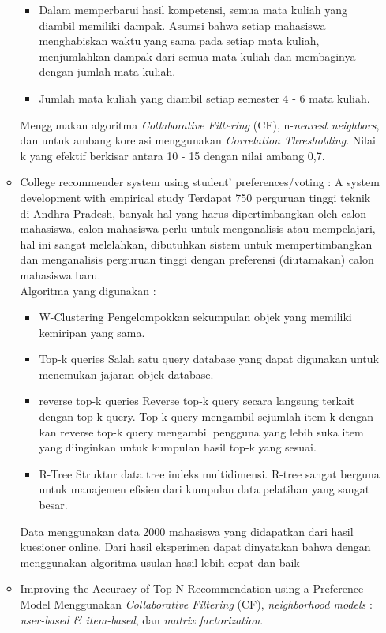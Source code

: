 \documentclass[a4paper,twoside]{article}
\begin{document}
\begin{enumerate}
\begin{itemize}
\begin{itemize}
				\item Dalam memperbarui hasil kompetensi, semua mata kuliah yang diambil memiliki dampak. Asumsi bahwa setiap mahasiswa menghabiskan waktu yang sama pada setiap mata kuliah, menjumlahkan dampak dari semua mata kuliah dan membaginya dengan jumlah mata kuliah. 
				\item Jumlah mata kuliah yang diambil setiap semester 4 - 6 mata kuliah.  
				\end{itemize}
				Menggunakan algoritma \textit{Collaborative Filtering} (CF), n-\textit{nearest neighbors}, dan untuk ambang korelasi menggunakan \textit{Correlation Thresholding}. Nilai k yang efektif berkisar antara 10 - 15 dengan nilai ambang 0,7. 
			\item College recommender system using student’ preferences/voting : A system development with empirical study
				Terdapat 750 perguruan tinggi teknik di Andhra Pradesh, banyak hal yang harus dipertimbangkan oleh calon mahasiswa, calon mahasiswa perlu untuk menganalisis atau mempelajari, hal ini sangat melelahkan, dibutuhkan sistem untuk mempertimbangkan dan menganalisis perguruan tinggi dengan preferensi (diutamakan) calon mahasiswa baru.\\
				Algoritma yang digunakan :
				\begin{itemize}
					\item W-Clustering
						Pengelompokkan sekumpulan objek yang memiliki kemiripan yang sama.
					\item Top-k queries
						Salah satu query database yang dapat digunakan untuk menemukan jajaran objek database.
					\item reverse top-k queries
						Reverse top-k query secara langsung terkait dengan top-k query. Top-k query mengambil sejumlah item k dengan kan reverse top-k query mengambil pengguna yang lebih suka item yang diinginkan untuk kumpulan hasil top-k yang sesuai.
					\item R-Tree
						Struktur data tree indeks multidimensi. R-tree sangat berguna untuk manajemen efisien dari kumpulan data pelatihan yang sangat besar. 
				\end{itemize}
		Data menggunakan data 2000 mahasiswa yang didapatkan dari hasil kuesioner online. Dari hasil eksperimen dapat dinyatakan bahwa dengan menggunakan algoritma usulan hasil lebih cepat dan baik
			\item Improving the Accuracy of Top-N Recommendation using a Preference Model
			Menggunakan \textit{Collaborative Filtering} (CF), \textit{neighborhood models} : \textit{user-based \& item-based}, dan \textit{matrix factorization}.\\

\end{itemize}
\end{enumerate}
\end{document}
